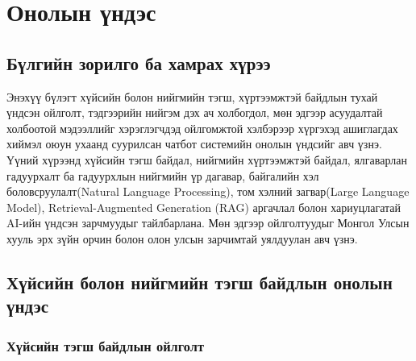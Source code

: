 
\chapter{Онолын үндэс} %
\label{Chapter1} %


\newcommand{\keyword}[1]{\textbf{#1}}
\newcommand{\tabhead}[1]{\textbf{#1}}
\newcommand{\code}[1]{\texttt{#1}}
\newcommand{\file}[1]{\texttt{\bfseries#1}}
\newcommand{\option}[1]{\texttt{\itshape#1}}





\section{Бүлгийн зорилго ба хамрах хүрээ}

Энэхүү бүлэгт хүйсийн болон нийгмийн тэгш, хүртээмжтэй байдлын тухай үндсэн ойлголт, тэдгээрийн нийгэм дэх ач холбогдол, мөн эдгээр асуудалтай холбоотой мэдээллийг хэрэглэгчдэд ойлгомжтой хэлбэрээр хүргэхэд ашиглагдах хиймэл оюун ухаанд суурилсан чатбот системийн онолын үндсийг авч үзнэ. Үүний хүрээнд хүйсийн тэгш байдал, нийгмийн хүртээмжтэй байдал, ялгаварлан гадуурхалт ба гадуурхлын нийгмийн үр дагавар, байгалийн хэл боловсруулалт(Natural Language Processing), том хэлний загвар(Large Language Model), Retrieval-Augmented Generation (RAG) аргачлал болон хариуцлагатай AI-ийн үндсэн зарчмуудыг тайлбарлана. Мөн эдгээр ойлголтуудыг Монгол Улсын хууль эрх зүйн орчин болон олон улсын зарчимтай уялдуулан авч үзнэ.


\section{Хүйсийн болон нийгмийн тэгш байдлын онолын үндэс}

\subsection{Хүйсийн тэгш байдлын ойлголт}

